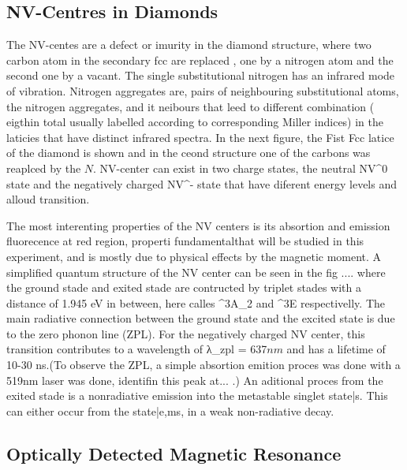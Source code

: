 \subsection{NV-Centres in Diamonds}
 The NV-centes are a defect or imurity in the diamond structure, where two carbon atom in the secondary fcc are replaced , one by a nitrogen atom and the second one by a  vacant. The single substitutional nitrogen has an infrared mode of vibration. Nitrogen aggregates are, pairs of neighbouring substitutional atoms, the nitrogen aggregates, and it neibours that leed to different combination ( eigthin total usually labelled according to corresponding Miller indices) in the laticies that have distinct infrared spectra. In the next figure, the Fist Fcc latice of the diamond is shown and in the ceond structure one of the carbons was reaplced by the $N$. NV-center can exist in two charge states, the neutral NV^{0} state and the negatively charged NV^{-} state that have diferent energy levels and alloud transition.
 
The most interenting properties of the NV centers is its absortion and emission fluorecence at red region, properti fundamentalthat will be studied in this experiment, and is mostly due to physical eﬀects by the magnetic moment. A simpliﬁed quantum structure of the NV center can be seen in the fig .... where the ground stade and exited stade are contructed by triplet stades with a distance of 1.945 eV in between, here calles ^{3}A_{2} and ^{3}E  respectivelly. The main radiative connection between the ground state and the excited state is due to the zero phonon line (ZPL). For the negatively charged NV center, this transition contributes to a wavelength of λ_{zpl} = 637$nm$ and has a lifetime of 10-30 ns.(To observe the ZPL, a simple absortion emition proces was done with a 519nm laser was done, identifin this peak at... .) 
An aditional proces from the exited stade is a nonradiative emission into the metastable singlet state\left|s\right\rangle . This can either occur from the state|e,ms\right\rangle , in a weak non-radiative decay.


\subsection{Optically Detected Magnetic Resonance}







